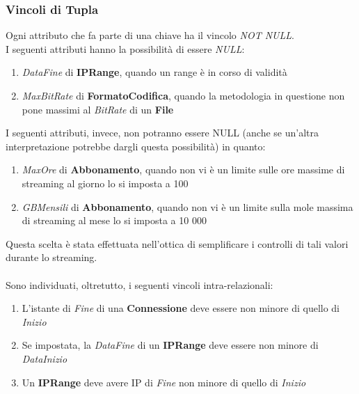 \documentclass{article}
\begin{document}
\subsubsection{Vincoli di Tupla}
Ogni attributo che fa parte di una chiave ha il vincolo \textit{NOT NULL}. \\ 
I seguenti attributi hanno la possibilità di essere \textit{NULL}: \\
\begin{enumerate}
\itemsep-0.25em
    \item \textit{DataFine} di \textbf{IPRange}, quando un range è in corso di validità
    
    \item \textit{MaxBitRate} di \textbf{FormatoCodifica}, quando la metodologia in questione non pone massimi al \textit{BitRate} di un \textbf{File}
\end{enumerate}
I seguenti attributi, invece, non potranno essere NULL (anche se un'altra interpretazione potrebbe dargli questa possibilità) in quanto: \\
\begin{enumerate}
\itemsep-0.25em
    \item \textit{MaxOre} di \textbf{Abbonamento}, quando non vi è un limite sulle ore massime di streaming al giorno lo si imposta a 100
    
    \item \textit{GBMensili} di \textbf{Abbonamento}, quando non vi è un limite sulla mole massima di streaming al mese lo si imposta a 10 000
\end{enumerate}
Questa scelta è stata effettuata nell'ottica di semplificare i controlli di tali valori durante lo streaming. \\ \\
Sono individuati, oltretutto, i seguenti vincoli intra-relazionali: \\
\begin{enumerate}
\itemsep-0.25em
    \item L'istante di \textit{Fine} di una \textbf{Connessione} deve essere non minore di quello di \textit{Inizio}
    
    \item Se impostata, la \textit{DataFine} di un \textbf{IPRange} deve essere non minore di \textit{DataInizio}
    
    \item Un \textbf{IPRange} deve avere IP di \textit{Fine} non minore di quello di \textit{Inizio}
\end{enumerate}
\end{document}
